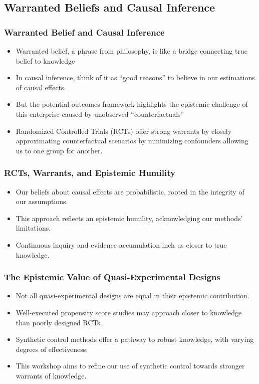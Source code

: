 \documentclass{beamer}
\begin{document}
\subsection{Warranted Beliefs and Causal Inference}

\begin{frame}
\frametitle{Warranted Belief and Causal Inference}
\begin{itemize}
  \item Warranted belief, a phrase from philosophy, is like a bridge connecting true belief to knowledge 
  \item In causal inference, think of it as ``good reasons'' to believe in our estimations of causal effects.
  \item But the potential outcomes framework highlights the epistemic challenge of this enterprise caused by unobserved ``counterfactuals''
  \item Randomized Controlled Trials (RCTs) offer strong warrants by closely approximating counterfactual scenarios by minimizing confounders allowing us to one group for another.
\end{itemize}
\end{frame}

\begin{frame}
\frametitle{RCTs, Warrants, and Epistemic Humility}
\begin{itemize}
  \item Our beliefs about causal effects are probabilistic, rooted in the integrity of our assumptions.
  \item This approach reflects an epistemic humility, acknowledging our methods' limitations.
  \item Continuous inquiry and evidence accumulation inch us closer to true knowledge.
\end{itemize}
\end{frame}

\begin{frame}
\frametitle{The Epistemic Value of Quasi-Experimental Designs}
\begin{itemize}
  \item Not all quasi-experimental designs are equal in their epistemic contribution.
  \item Well-executed propensity score studies may approach closer to knowledge than poorly designed RCTs.
  \item Synthetic control methods offer a pathway to robust knowledge, with varying degrees of effectiveness.
  \item This workshop aims to refine our use of synthetic control towards stronger warrants of knowledge.
\end{itemize}
\end{frame}
\end{document}
